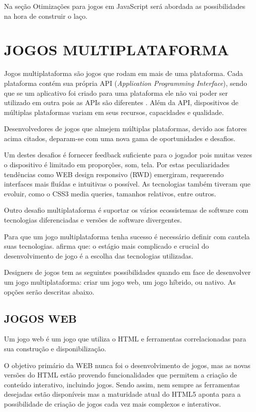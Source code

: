 Na seção Otimizações para jogos em JavaScript será abordada as
possibilidades na hora de construir o laço.

\section{JOGOS MULTIPLATAFORMA}

Jogos multiplataforma são jogos que rodam em mais de uma plataforma.
Cada plataforma contém sua própria API (\textit{Application
Programming Interface}), sendo que se um aplicativo foi criado para
uma plataforma ele não vai poder ser utilizado em outra pois as APIs
são diferentes \autocite{crossPlatformMobileGameDevelopment}. Além da
API, dispositivos de múltiplas plataformas variam em seus recursos,
capacidades e qualidade.

Desenvolvedores de jogos que almejem múltiplas plataformas, devido aos
fatores acima citados, deparam-se com uma nova gama de oportunidades e
desafios.

Um destes desafios é fornecer feedback suficiente para o jogador pois
muitas vezes o dispositivo é limitado em proporções, som, tela.
Por estas peculiaridades tendências como WEB design responsivo (RWD)
emergiram, requerendo interfaces mais fluídas e intuitivas o possível.
As tecnologias também tiveram que evoluir, como o CSS3 media queries,
tamanhos relativos, entre outros.

Outro desafio multiplataforma é suportar os vários ecossistemas
de software com tecnologias diferenciadas e versões de software
divergentes.

Para que um jogo multiplataforma tenha sucesso é necessário definir
com cautela suas tecnologias. \cite{html5mostwanted} afirma que: o
estágio mais complicado e crucial do desenvolvimento de jogo é a
escolha das tecnologias utilizadas.

Designers de jogos tem as seguintes possibilidades quando em face
de desenvolver um jogo multiplataforma: criar um jogo web, um jogo
híbrido, ou nativo. As opções serão descritas abaixo.

\subsection{JOGOS WEB}

Um jogo web é um jogo que utiliza o HTML e ferramentas correlacionadas
para sua construção e disponibilização.

O objetivo primário da WEB nunca foi o desenvolvimento de
jogos, mas as novas versões do HTML estão provendo funcionalidades
que permitem a criação de conteúdo interativo, incluindo jogos. Sendo 
assim, nem sempre as ferramentas desejadas estão disponíveis mas a 
maturidade atual do HTML5 aponta para a possibilidade de criação de 
jogos cada vez mais complexos e interativos.

